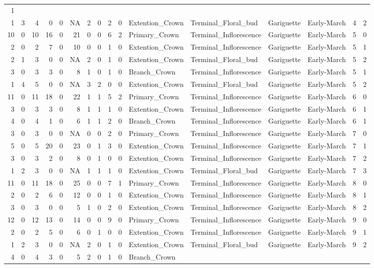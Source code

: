 \documentclass[]{article}
\begin{document}
\begin{longtable}[]{@{}rrrrrrrrrrllllrl@{}}
1\tabularnewline
1 & 3 & 4 & 0 & 0 & NA & 2 & 0 & 2 & 0 & Extention\_Crown &
Terminal\_Floral\_bud & Gariguette & Early-March & 4 & 2\tabularnewline
10 & 0 & 10 & 16 & 0 & 21 & 0 & 0 & 6 & 2 & Primary\_Crown &
Terminal\_Inflorescence & Gariguette & Early-March & 5 &
0\tabularnewline
2 & 0 & 2 & 7 & 0 & 10 & 0 & 0 & 1 & 0 & Extention\_Crown &
Terminal\_Inflorescence & Gariguette & Early-March & 5 &
1\tabularnewline
2 & 1 & 3 & 0 & 0 & NA & 2 & 0 & 1 & 0 & Extention\_Crown &
Terminal\_Floral\_bud & Gariguette & Early-March & 5 & 2\tabularnewline
3 & 0 & 3 & 3 & 0 & 8 & 1 & 0 & 1 & 0 & Branch\_Crown &
Terminal\_Inflorescence & Gariguette & Early-March & 5 &
1\tabularnewline
1 & 4 & 5 & 0 & 0 & NA & 3 & 2 & 0 & 0 & Extention\_Crown &
Terminal\_Floral\_bud & Gariguette & Early-March & 5 & 2\tabularnewline
11 & 0 & 11 & 18 & 0 & 22 & 1 & 1 & 5 & 2 & Primary\_Crown &
Terminal\_Inflorescence & Gariguette & Early-March & 6 &
0\tabularnewline
3 & 0 & 3 & 3 & 0 & 8 & 1 & 1 & 1 & 0 & Extention\_Crown &
Terminal\_Inflorescence & Gariguette & Early-March & 6 &
1\tabularnewline
4 & 0 & 4 & 1 & 0 & 6 & 1 & 1 & 2 & 0 & Branch\_Crown &
Terminal\_Inflorescence & Gariguette & Early-March & 6 &
1\tabularnewline
3 & 0 & 3 & 0 & 0 & NA & 0 & 0 & 2 & 0 & Primary\_Crown &
Terminal\_Inflorescence & Gariguette & Early-March & 7 &
0\tabularnewline
5 & 0 & 5 & 20 & 0 & 23 & 0 & 1 & 3 & 0 & Extention\_Crown &
Terminal\_Inflorescence & Gariguette & Early-March & 7 &
1\tabularnewline
3 & 0 & 3 & 2 & 0 & 8 & 0 & 1 & 0 & 0 & Extention\_Crown &
Terminal\_Inflorescence & Gariguette & Early-March & 7 &
2\tabularnewline
1 & 2 & 3 & 0 & 0 & NA & 1 & 1 & 1 & 0 & Extention\_Crown &
Terminal\_Floral\_bud & Gariguette & Early-March & 7 & 3\tabularnewline
11 & 0 & 11 & 18 & 0 & 25 & 0 & 0 & 7 & 1 & Primary\_Crown &
Terminal\_Inflorescence & Gariguette & Early-March & 8 &
0\tabularnewline
2 & 0 & 2 & 6 & 0 & 12 & 0 & 0 & 1 & 0 & Extention\_Crown &
Terminal\_Inflorescence & Gariguette & Early-March & 8 &
1\tabularnewline
3 & 0 & 3 & 0 & 0 & 5 & 1 & 0 & 2 & 0 & Extention\_Crown &
Terminal\_Inflorescence & Gariguette & Early-March & 8 &
2\tabularnewline
12 & 0 & 12 & 13 & 0 & 14 & 0 & 0 & 9 & 0 & Primary\_Crown &
Terminal\_Inflorescence & Gariguette & Early-March & 9 &
0\tabularnewline
2 & 0 & 2 & 5 & 0 & 6 & 0 & 1 & 0 & 0 & Extention\_Crown &
Terminal\_Inflorescence & Gariguette & Early-March & 9 &
1\tabularnewline
1 & 2 & 3 & 0 & 0 & NA & 2 & 0 & 1 & 0 & Extention\_Crown &
Terminal\_Floral\_bud & Gariguette & Early-March & 9 & 2\tabularnewline
4 & 0 & 4 & 3 & 0 & 5 & 2 & 0 & 1 & 0 & Branch\_Crown &

\end{longtable}
\end{document}

